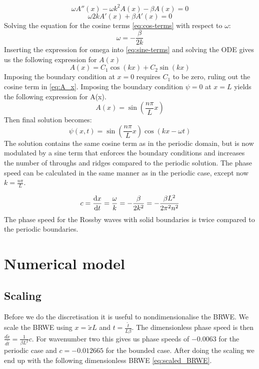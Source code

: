\begin{equation}\label{eq:sine-terms}
    \omega A''(x) -\omega k^2 A(x) - \beta A(x) = 0
\end{equation}
\begin{equation}\label{eq:cos-terms}
    \omega 2 k A'(x) + \beta A'(x) = 0
\end{equation}
Solving the equation for the cosine terms \cref{eq:cos-terms} with respect to
$\omega$:
\begin{equation}
    \omega = -\frac{\beta}{2k}
\end{equation}
Inserting the expression for omega into \cref{eq:sine-terms} and solving the ODE
gives us the following expression for $A(x)$
\begin{equation}\label{eq:A_x}
    A(x) = C_1 \cos{(kx) + C_2 \sin{(kx)}}
\end{equation}
Imposing the boundary condition at $x=0$ requires $C_1$ to be zero, ruling
out the cosine term in \cref{eq:A_x}. Imposing the boundary condition $\psi=0$
at $x=L$ yields the following expression for A(x).
\begin{equation}
    A(x) = \sin{\left(\frac{n\pi}{L} x \right)}
\end{equation}
Then final solution becomes:
\begin{equation}
    \psi(x,t) = \sin{\left(\frac{n\pi}{L} x \right)} \cos{(kx - \omega t)}
\end{equation}
The solution contains the same cosine term as in the periodic domain, but is now
modulated by a sine term that enforces the boundary conditions and increases
the number of throughs and ridges compared to the periodic solution.
The phase speed can be calculated in the same manner as in the periodic case,
except now $k=\frac{n\pi}{L}$.

\begin{equation}
    c = \dv{x}{t} = \frac{\omega}{k} = -\frac{\beta}{2k^2} = -\frac{\beta L^2}{2
    \pi^2 n^2}
\end{equation}
The phase speed for the Rossby waves with solid boundaries is twice compared to
the periodic boundaries.

\section{Numerical model}


\subsection{Scaling}
Before we do the discretisation it is useful to nondimensionalise the BRWE.
We scale the BRWE using $x = \tilde{x} L $ and $t = \frac{\tilde{t}}{L \beta}$.
The dimensionless phase speed is then $\frac{d\tilde{x}}{d\tilde{t}} = \frac{1}
{\beta L^2} c$. For wavenumber two this gives us phase speeds of
$-0.0063$ for the periodic case and $c = -0.012665$ for the bounded case.
After doing the scaling we end up with the following dimensionless BRWE
\cref{eq:scaled_BRWE}.

